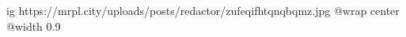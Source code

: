  
 
 
 
 

\ifcmt
  ig https://mrpl.city/uploads/posts/redactor/zufeqifhtqnqbqmz.jpg
  @wrap center
  @width 0.9
\fi
